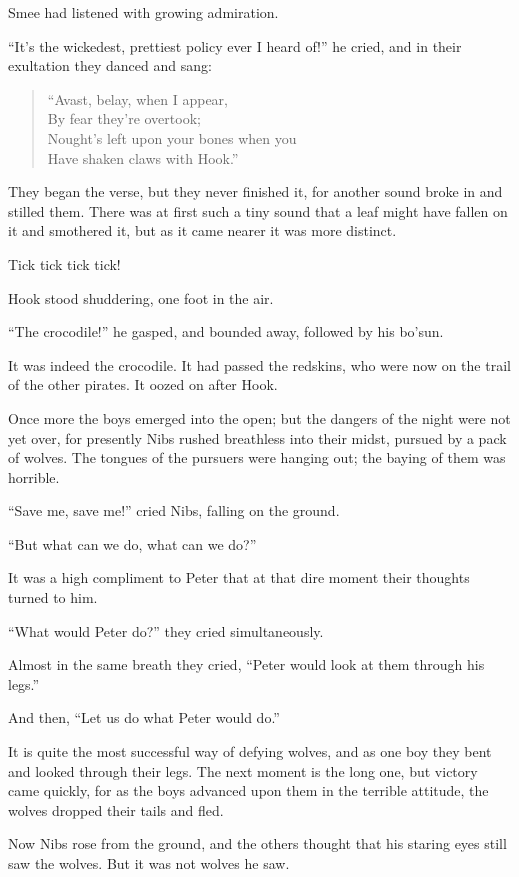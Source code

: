 Smee had listened with growing admiration.

“It’s the wickedest, prettiest policy ever I heard of!\@” he cried,
and in their exultation they danced and sang:

\begin{verse}
	“Avast, belay, when I appear,\\
	By fear they’re overtook;\\
	Nought’s left upon your bones when you\\
	Have shaken claws with Hook.”
\end{verse}

They began the verse, but they never finished it,
for another sound broke in and stilled them.
There was at first such a tiny sound that a leaf might have fallen on it and smothered it,
but as it came nearer it was more distinct.

Tick tick tick tick!

Hook stood shuddering, one foot in the air.

“The crocodile!\@” he gasped, and bounded away, followed by his bo’sun.

It was indeed the crocodile.
It had passed the redskins, who were now on the trail of the other pirates.
It oozed on after Hook.

Once more the boys emerged into the open;
but the dangers of the night were not yet over,
for presently Nibs rushed breathless into their midst, pursued by a pack of wolves.
The tongues of the pursuers were hanging out;
the baying of them was horrible.

“Save me, save me!\@” cried Nibs, falling on the ground.

“But what can we do, what can we do?”

It was a high compliment to Peter that at that dire moment their thoughts turned to him.

“What would Peter do?\@” they cried simultaneously.

Almost in the same breath they cried, “Peter would look at them through his legs.”

And then, “Let us do what Peter would do.”

It is quite the most successful way of defying wolves,
and as one boy they bent and looked through their legs.
The next moment is the long one, but victory came quickly,
for as the boys advanced upon them in the terrible attitude, the wolves dropped their tails and fled.

Now Nibs rose from the ground, and the others thought that his staring eyes still saw the wolves.
But it was not wolves he saw.

